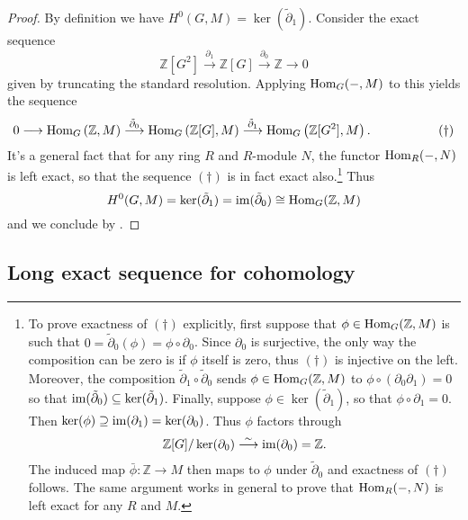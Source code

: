 \documentclass[11pt]{amsart}
\numberwithin{equation}{section}
\theoremstyle{remark}
\theoremstyle{remark}
\theoremstyle{remark}
\theoremstyle{definition}
\theoremstyle{definition}
\theoremstyle{definition}
\theoremstyle{definition}
\theoremstyle{definition}
\theoremstyle{definition}
\begin{document}
\begin{proof}
By definition we have $H^0(G,M)=\ker(\tilde{\partial}_1)$. Consider the exact sequence
\[\mathbb{Z}[G^2]\stackrel{\partial_1}{\longrightarrow} \mathbb{Z}[G]\stackrel{\partial_0}{\longrightarrow} \mathbb{Z} \longrightarrow 0\]
given by truncating the standard resolution. Applying $\textup{Hom}_G(-,M)$ to this yields the sequence
\[0\longrightarrow \textup{Hom}_G\left(\mathbb{Z},M\right) \stackrel{\tilde{\partial}_0}{\longrightarrow}\textup{Hom}_{G}\left(\mathbb{Z}[G],M\right)\stackrel{\tilde{\partial}_1}{\longrightarrow}\textup{Hom}_{G}\left(\mathbb{Z}[G^2],M\right).\phantom{how do you do}(\dagger)\]
It's a general fact that for any ring $R$ and $R$-module $N$, the functor $\textup{Hom}_R(-,N)$ is left exact, so that the sequence $(\dagger)$ is in fact exact also.\footnote{To prove exactness of $(\dagger)$ explicitly, first suppose that $\phi \in \textup{Hom}_G(\mathbb{Z},M)$ is such that $0=\tilde{\partial}_0(\phi)=\phi \circ \partial_0$. Since $\partial_0$ is surjective, the only way the composition can be zero is if $\phi$ itself is zero, thus $ (\dagger)$ is injective on the left. Moreover, the composition $\tilde{\partial}_1\circ \tilde{\partial}_0$ sends $\phi\in \textup{Hom}_G(\mathbb{Z},M)$ to $\phi \circ (\partial_0\partial_1)=0$ so that $\textup{im}(\tilde{\partial}_0)\subseteq \ker(\tilde{\partial}_1)$. Finally, suppose $\phi \in \ker(\tilde{\partial}_1)$, so that $\phi \circ \partial_1=0$. Then $\ker(\phi)\supseteq \textup{im}(\partial_1)=\ker(\partial_0)$. Thus $\phi$ factors through
\[\mathbb{Z}[G]/\ker(\partial_0)\stackrel{\sim}{\longrightarrow}\textup{im}(\partial_0)=\mathbb{Z}.\]
The induced map $\bar{\phi}:\mathbb{Z}\rightarrow M$ then maps to $\phi$ under $\tilde{\partial}_0$ and  exactness of $(\dagger)$ follows. The same argument works in general to prove that $\textup{Hom}_R(-,N)$ is left exact for any $R$ and $M$.} 
Thus
 \[H^0(G,M)=\ker(\tilde{\partial}_1)=\textup{im}(\tilde{\partial}_0)\cong \textup{Hom}_G(\mathbb{Z},M)\]
 and we conclude by .
\end{proof}

\subsection{Long exact sequence for cohomology}
\end{document}
